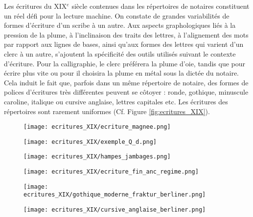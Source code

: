 Les écritures du XIX$^{e}$ siècle contenues dans les répertoires de notaires constituent un réel défi pour la lecture machine. On constate de grandes variabilités de formes d'écriture d'un scribe à un autre. Aux aspects graphologiques liés à la pression de la plume, à l'inclinaison des traits des lettres, à l'alignement des mots par rapport aux lignes de bases, ainsi qu'aux formes des lettres qui varient d'un clerc à un autre, s'ajoutent la spécificité des outils utilisés suivant le contexte d'écriture. Pour la calligraphie, le clerc préférera la plume d'oie, tandis que pour écrire plus vite ou pour  il choisira la plume en métal sous la dictée du notaire. Cela induit le fait que, parfois dans un même répertoire de notaire, des formes de polices d'écritures très différentes peuvent se côtoyer : ronde, gothique, minuscule caroline, italique ou cursive anglaise, lettres capitales etc. Les écritures des répertoires sont rarement uniformes (Cf. Figure \ref{fig:ecritures_XIX}).
\newpage
\begin{figure}[!h]
    \begin{minipage}[c]{.46\linewidth} 
        \centering
        \texttt{[image: ecritures\_XIX/ecriture\_magnee.png]}
    \end{minipage}
    \hfill%
    \begin{minipage}[c]{.46\linewidth}
        \centering
        \texttt{[image: ecritures\_XIX/exemple\_Q\_d.png]}    
    \end{minipage}
\end{figure}
\begin{figure}[!h]
        \centering
        \texttt{[image: ecritures\_XIX/hampes\_jambages.png]}
\end{figure}
\begin{figure}[!h]
    \begin{minipage}[c]{.46\linewidth} 
        \centering
        \texttt{[image: ecritures\_XIX/ecriture\_fin\_anc\_regime.png]}
        \end{minipage}
    \hfill%
    \begin{minipage}[c]{.46\linewidth}
        \centering
        \texttt{[image: ecritures\_XIX/gothique\_moderne\_fraktur\_berliner.png]}
    \end{minipage}
\end{figure}
\begin{figure}[!h]
        \centering
        \texttt{[image: ecritures\_XIX/cursive\_anglaise\_berliner.png]}
\end{figure}

